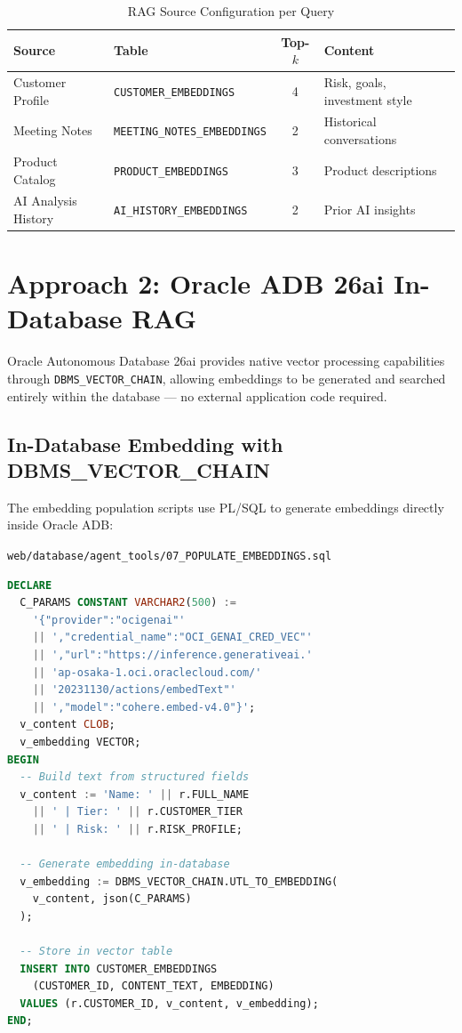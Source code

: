 \documentclass[12pt,a4paper]{article}
\begin{document}
\begin{table}[H]
\centering
\caption{RAG Source Configuration per Query}
\label{tab:rag-sources}
\begin{tabularx}{\textwidth}{l l c X}
\toprule
\textbf{Source} & \textbf{Table} & \textbf{Top-$k$} & \textbf{Content} \\
\midrule
Customer Profile & \texttt{CUSTOMER\_EMBEDDINGS} & 4 & Risk, goals, investment style \\
Meeting Notes & \texttt{MEETING\_NOTES\_EMBEDDINGS} & 2 & Historical conversations \\
Product Catalog & \texttt{PRODUCT\_EMBEDDINGS} & 3 & Product descriptions \\
AI Analysis History & \texttt{AI\_HISTORY\_EMBEDDINGS} & 2 & Prior AI insights \\
\bottomrule
\end{tabularx}
\end{table}

\section{Approach 2: Oracle ADB 26ai In-Database RAG}
\label{sec:adb-rag}

Oracle Autonomous Database 26ai provides native vector processing capabilities through \texttt{DBMS\_VECTOR\_CHAIN}, allowing embeddings to be generated and searched entirely within the database — no external application code required.

\subsection{In-Database Embedding with DBMS\_VECTOR\_CHAIN}

The embedding population scripts use PL/SQL to generate embeddings directly inside Oracle ADB:

\texttt{web/database/agent\_tools/07\_POPULATE\_EMBEDDINGS.sql}

\begin{lstlisting}[language=SQL, caption={DBMS\_VECTOR\_CHAIN embedding generation}]
DECLARE
  C_PARAMS CONSTANT VARCHAR2(500) :=
    '{"provider":"ocigenai"'
    || ',"credential_name":"OCI_GENAI_CRED_VEC"'
    || ',"url":"https://inference.generativeai.'
    || 'ap-osaka-1.oci.oraclecloud.com/'
    || '20231130/actions/embedText"'
    || ',"model":"cohere.embed-v4.0"}';
  v_content CLOB;
  v_embedding VECTOR;
BEGIN
  -- Build text from structured fields
  v_content := 'Name: ' || r.FULL_NAME
    || ' | Tier: ' || r.CUSTOMER_TIER
    || ' | Risk: ' || r.RISK_PROFILE;

  -- Generate embedding in-database
  v_embedding := DBMS_VECTOR_CHAIN.UTL_TO_EMBEDDING(
    v_content, json(C_PARAMS)
  );

  -- Store in vector table
  INSERT INTO CUSTOMER_EMBEDDINGS
    (CUSTOMER_ID, CONTENT_TEXT, EMBEDDING)
  VALUES (r.CUSTOMER_ID, v_content, v_embedding);
END;
\end{lstlisting}
\end{document}
